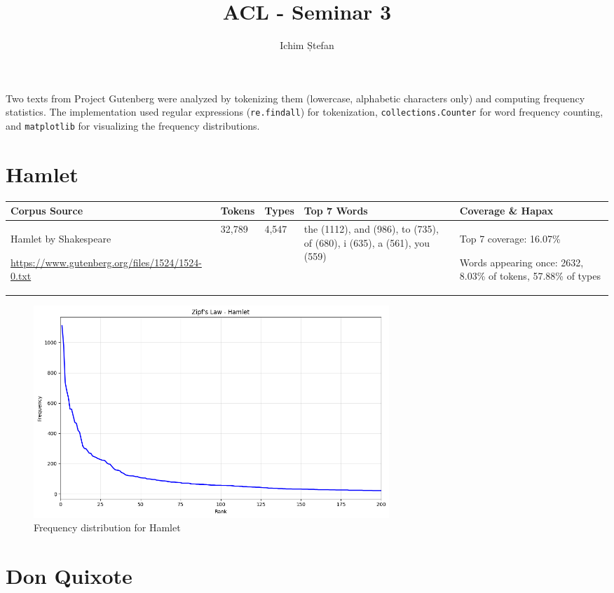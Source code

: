 \documentclass[11pt]{article}
\title{ACL - Seminar 3}
\author{Ichim Ștefan}
\date{}
\begin{document}
\maketitle

Two texts from Project Gutenberg were analyzed by tokenizing them (lowercase, alphabetic characters only) and computing frequency statistics. The implementation used regular expressions (\texttt{re.findall}) for tokenization, \texttt{collections.Counter} for word frequency counting, and \texttt{matplotlib} for visualizing the frequency distributions.

\section{Hamlet}

\begin{table}[h]
\centering
\small
\begin{tabularx}{\textwidth}{|X|X|X|X|X|}
\hline
\textbf{Corpus Source} & \textbf{Tokens} & \textbf{Types} & \textbf{Top 7 Words} & \textbf{Coverage \& Hapax} \\
\hline
Hamlet by Shakespeare

\url{https://www.gutenberg.org/files/1524/1524-0.txt} & 32,789 & 4,547 & the (1112), and (986), to (735), of (680), i (635), a (561), you (559) & Top 7 coverage: 16.07\%

Words appearing once: 2632, 8.03\% of tokens, 57.88\% of types \\
\hline
\end{tabularx}
\end{table}

\begin{figure}[h]
\centering
\includegraphics[width=0.65\textwidth]{zipf_hamlet.png}
\caption{Frequency distribution for Hamlet}
\end{figure}

\section{Don Quixote}
\end{document}
